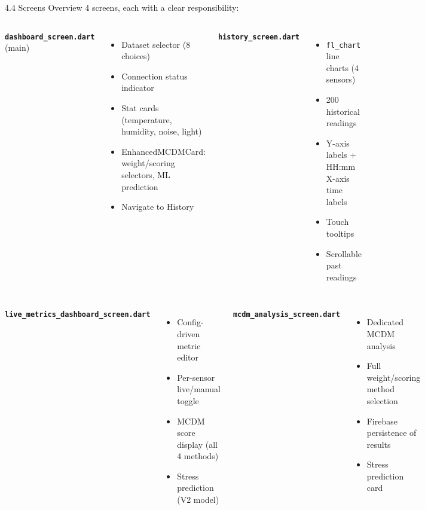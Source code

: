 \documentclass[aspectratio=169]{beamer}
\begin{document}
\begin{frame}{4.4 Screens Overview}
  4 screens, each with a clear responsibility:

  \vspace{0.3cm}
  \begin{columns}
    \textbf{\texttt{dashboard\_screen.dart}} (main)
    \begin{itemize}
      \item Dataset selector (8 choices)
      \item Connection status indicator
      \item Stat cards (temperature, humidity, noise, light)
      \item \alert{EnhancedMCDMCard}: weight/scoring selectors, ML prediction
      \item Navigate to History
    \end{itemize}

    \textbf{\texttt{history\_screen.dart}}
    \begin{itemize}
      \item \texttt{fl\_chart} line charts (4 sensors)
      \item 200 historical readings
      \item Y-axis labels + HH:mm X-axis time labels
      \item Touch tooltips
      \item Scrollable past readings
    \end{itemize}
  \end{columns}

  \vspace{0.3cm}
  \begin{columns}
    \textbf{\texttt{live\_metrics\_dashboard\_screen.dart}}
    \begin{itemize}
      \item Config-driven metric editor
      \item Per-sensor live/manual toggle
      \item MCDM score display (all 4 methods)
      \item Stress prediction (V2 model)
    \end{itemize}

    \textbf{\texttt{mcdm\_analysis\_screen.dart}}
    \begin{itemize}
      \item Dedicated MCDM analysis
      \item Full weight/scoring method selection
      \item Firebase persistence of results
      \item Stress prediction card
    \end{itemize}
  \end{columns}
\end{frame}
\end{document}
